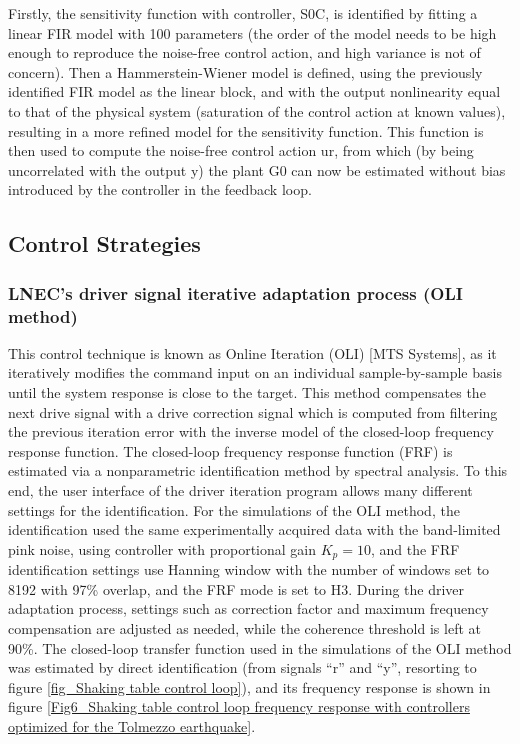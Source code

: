 \documentclass[conference]{IEEEtran}
\begin{document}
Firstly, the sensitivity function with controller, S0C, is identified by fitting a linear FIR model with 100 parameters (the order of the model needs to be high enough to reproduce the noise-free control action, and high variance is not of concern). Then a Hammerstein-Wiener model is defined, using the previously identified FIR model as the linear block, and with the output nonlinearity equal to that of the physical system (saturation of the control action at known values), resulting in a more refined model for the sensitivity function. This function is then used to compute the noise-free control action ur, from which (by being uncorrelated with the output y) the plant G0 can now be estimated without bias introduced by the controller in the feedback loop. 

\subsection{Control Strategies}

\subsubsection{LNEC's driver signal iterative adaptation process (OLI method)}
This control technique is known as Online Iteration (OLI) [MTS Systems], as it iteratively modifies the command input on an individual sample-by-sample basis until the system response is close to the target. 
This method compensates the next drive signal with a drive correction signal which is computed from filtering the previous iteration error with the inverse model of the closed-loop frequency response function. The closed-loop frequency response function (FRF) is estimated via a nonparametric identification method by spectral analysis. To this end, the user interface of the driver iteration program allows many different settings for the identification. For the simulations of the OLI method, the identification used the same experimentally acquired data with the band-limited pink noise, using controller with proportional gain $K_p=10$, and the FRF identification settings use Hanning window with the number of windows set to 8192 with 97\% overlap, and the FRF mode is set to H3. During the driver adaptation process, settings such as correction factor and maximum frequency compensation are adjusted as needed, while the coherence threshold is left at 90\%.
The closed-loop transfer function used in the simulations of the OLI method was estimated by direct identification (from signals “r” and “y”, resorting to figure \ref{fig_Shaking table control loop}), and its frequency response is shown in figure \ref{Fig6_Shaking table control loop frequency response with controllers optimized for the Tolmezzo earthquake}.
\end{document}
